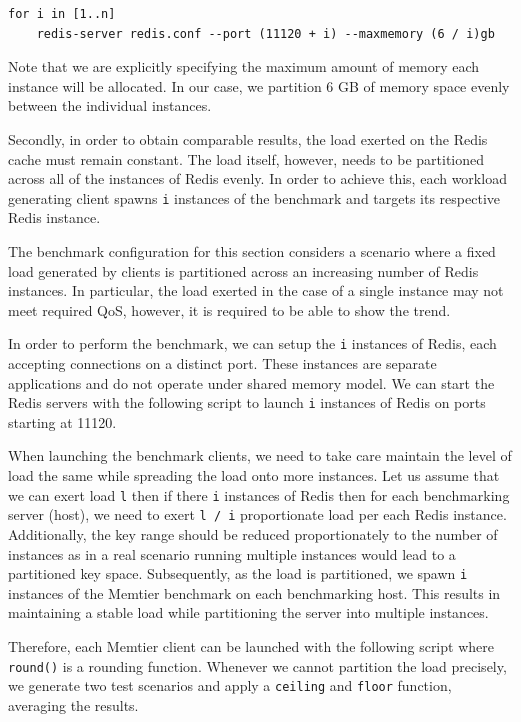 \begin{lstlisting}
for i in [1..n]
    redis-server redis.conf --port (11120 + i) --maxmemory (6 / i)gb
\end{lstlisting}

Note that we are explicitly specifying the maximum amount of memory each instance will be allocated. In our case, we partition 6 GB of memory space evenly between the individual instances.

Secondly, in order to obtain comparable results, the load exerted on the Redis cache must remain constant. The load itself, however, needs to be partitioned across all of the instances of Redis evenly. In order to achieve this, each workload generating client spawns \texttt{i} instances of the benchmark and targets its respective Redis instance.



The benchmark configuration for this section considers a scenario where a fixed load generated by clients is partitioned across an increasing number of Redis instances. In particular, the load exerted in the case of a single instance may not meet required QoS, however, it is required to be able to show the trend.

In order to perform the benchmark, we can setup the \texttt{i} instances of Redis, each accepting connections on a distinct port. These instances are separate applications and do not operate under shared memory model. We can start the Redis servers with the following script to launch \texttt{i} instances of Redis on ports starting at 11120.



When launching the benchmark clients, we need to take care maintain the level of load the same while spreading the load onto more instances. Let us assume that we can exert load \texttt{l} then if there \texttt{i} instances of Redis then for each benchmarking server (host), we need to exert \texttt{l / i} proportionate load per each Redis instance. Additionally, the key range should be reduced proportionately to the number of instances as in a real scenario running multiple instances would lead to a partitioned key space. Subsequently, as the load is partitioned, we spawn \texttt{i} instances of the Memtier benchmark on each benchmarking host. This results in maintaining a stable load while partitioning the server into multiple instances.

Therefore, each Memtier client can be launched with the following script where \texttt{round()} is a rounding function. Whenever we cannot partition the load precisely, we generate two test scenarios and apply a \texttt{ceiling} and \texttt{floor} function, averaging the results.

